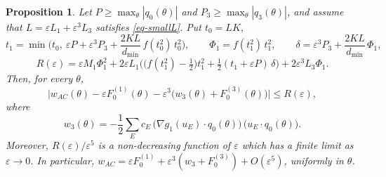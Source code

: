 \documentclass[a4paper,11pt,twoside,leqno]{article}
\newtheorem{prop}[teo]{Proposition}
\newcommand{\eps}[0]{\varepsilon}
\numberwithin{equation}{section}
\begin{document}
\begin{prop}\label{prop-w3}
Let $P \geq \max_\theta |q_0(\theta)|$ and $P_3 \geq \max_\theta |q_3(\theta)|$, and assume that $L = \eps L_1 + \eps^3 L_3$ satisfies \eqref{eq-smallL}. Put $t_0 = LK$,
\[
t_1 = \min\Big( t_0,\ \eps P + \eps^3 P_3 + \frac{2KL}{d_{\min}}\, f(t_0^2)\, t_0^2 \Big),
\qquad
\Phi_1 = f(t_1^2)\, t_1^2,
\qquad
\delta = \eps^3 P_3 + \frac{2KL}{d_{\min}}\, \Phi_1,
\]
\[
R(\eps) = \eps M_1 \Phi_1^2 + 2 \eps L_1 \Big( \big(f(t_1^2) - \tfrac{1}{2}\big) t_1^2 + \tfrac{1}{2} (t_1 + \eps P)\, \delta \Big) + 2 \eps^3 L_3 \Phi_1.
\]
Then, for every $\theta$,
\[
\Big| w_{AC}(\theta) - \eps F_0^{(1)}(\theta) - \eps^3 \big( w_3(\theta) + F_0^{(3)}(\theta) \big) \Big| \leq R(\eps),
\]
where
\[
w_3(\theta) = -\frac{1}{2} \sum_E c_E\, \big(\nabla g_1(u_E) \cdot q_0(\theta)\big)\,\big(u_E \cdot q_0(\theta)\big).
\]
Moreover, $R(\eps)/\eps^5$ is a non-decreasing function of $\eps$ which has a finite limit as $\eps \to 0$. In particular, $w_{AC} = \eps F_0^{(1)} + \eps^3 (w_3 + F_0^{(3)}) + O(\eps^5)$, uniformly in $\theta$.
\end{prop}
\end{document}
